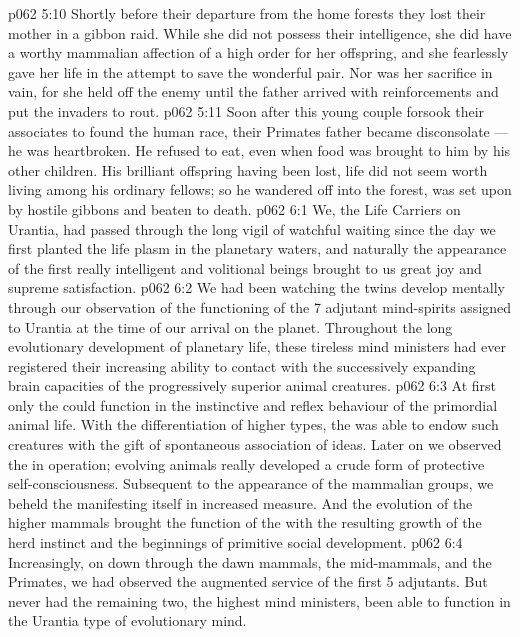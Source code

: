 \vs p062 5:10 Shortly before their departure from the home forests they lost their mother in a gibbon raid. While she did not possess their intelligence, she did have a worthy mammalian affection of a high order for her offspring, and she fearlessly gave her life in the attempt to save the wonderful pair. Nor was her sacrifice in vain, for she held off the enemy until the father arrived with reinforcements and put the invaders to rout.
\vs p062 5:11 Soon after this young couple forsook their associates to found the human race, their Primates father became disconsolate --- he was heartbroken. He refused to eat, even when food was brought to him by his other children. His brilliant offspring having been lost, life did not seem worth living among his ordinary fellows; so he wandered off into the forest, was set upon by hostile gibbons and beaten to death.
\vs p062 6:1 We, the Life Carriers on Urantia, had passed through the long vigil of watchful waiting since the day we first planted the life plasm in the planetary waters, and naturally the appearance of the first really intelligent and volitional beings brought to us great joy and supreme satisfaction.
\vs p062 6:2 We had been watching the twins develop mentally through our observation of the functioning of the 7 adjutant mind\hyp{}spirits assigned to Urantia at the time of our arrival on the planet. Throughout the long evolutionary development of planetary life, these tireless mind ministers had ever registered their increasing ability to contact with the successively expanding brain capacities of the progressively superior animal creatures.
\vs p062 6:3 At first only the  could function in the instinctive and reflex behaviour of the primordial animal life. With the differentiation of higher types, the  was able to endow such creatures with the gift of spontaneous association of ideas. Later on we observed the  in operation; evolving animals really developed a crude form of protective self\hyp{}consciousness. Subsequent to the appearance of the mammalian groups, we beheld the  manifesting itself in increased measure. And the evolution of the higher mammals brought the function of the  with the resulting growth of the herd instinct and the beginnings of primitive social development.
\vs p062 6:4 Increasingly, on down through the dawn mammals, the mid\hyp{}mammals, and the Primates, we had observed the augmented service of the first 5 adjutants. But never had the remaining two, the highest mind ministers, been able to function in the Urantia type of evolutionary mind.
